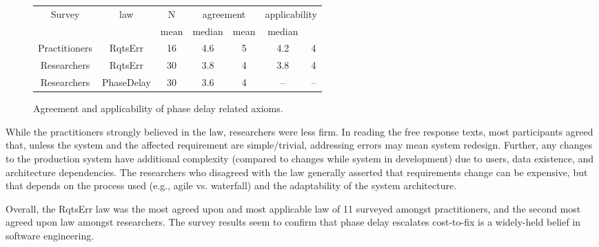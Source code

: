 \begin{figure}[!h]
\renewcommand{\baselinestretch}{0.7}
\scriptsize
\begin{center}
\begin{tabular}{c|c|c|c|c|c|c}
Survey & law & N & \multicolumn{2}{c}{agreement} & \multicolumn{2}{c}{applicability} \\ 
 & & mean & median & mean & median \\
\hline 
Practitioners & RqtsErr & 16 & 4.6 & 5 & 4.2 & 4 \\ 
Researchers & RqtsErr & 30 & 3.8 & 4 & 3.8 & 4 \\ 
Researchers & PhaseDelay & 30 & 3.6 & 4 & -- & -- 
\end{tabular} 
\end{center}
\caption{Agreement and applicability of phase delay related axioms.}
\label{fig:survey_results}
\end{figure}

While the practitioners strongly believed in the law, researchers were less firm. In reading the free response texts, most participants agreed that, unless the system and the affected requirement are simple/trivial, addressing errors may mean system redesign. Further, any changes to the production system have additional complexity (compared to changes while system in development) due to users, data existence, and architecture dependencies. The researchers who disagreed with the law generally asserted that requirements change can be expensive, but that depends on the process used (e.g., agile vs. waterfall) and the adaptability of the system architecture.

Overall, the RqtsErr law was the most agreed upon and most applicable law of 11 surveyed amongst practitioners, and the second most agreed upon law amongst researchers. The survey results seem to confirm that phase delay escalates cost-to-fix is a widely-held belief in software engineering.